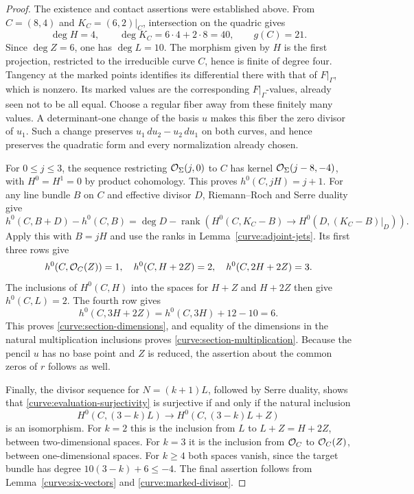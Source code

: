 \begin{proof}
The existence and contact assertions were established above.  From
$C=(8,4)$ and $K_C=(6,2)|_C$, intersection on the quadric gives
\[
 \deg H=4,\qquad \deg K_C=6\cdot4+2\cdot8=40,
 \qquad g(C)=21.
\]
Since $\deg Z=6$, one has $\deg L=10$.  The morphism given by $H$ is
the first projection, restricted to the irreducible curve $C$, hence
is finite of degree four.  Tangency at the marked points identifies
its differential there with that of $F|_\Gamma$, which is nonzero.
Its marked values are the corresponding $F|_\Gamma$-values, already
seen not to be all equal.  Choose a regular fiber away from these
finitely many values.  A determinant-one change of the basis $u$
makes this fiber the zero divisor of $u_1$.  Such a change preserves
$u_1\,du_2-u_2\,du_1$ on both curves, and hence preserves the
quadratic form and every normalization already chosen.

For $0\le j\le3$, the sequence restricting $\mathcal O_\Sigma(j,0)$ to
$C$ has kernel $\mathcal O_\Sigma(j-8,-4)$, with $H^0=H^1=0$ by product
cohomology.  This proves $h^0(C,jH)=j+1$.  For any line bundle $B$
on $C$ and effective divisor $D$, Riemann--Roch and Serre duality give
\begin{equation}\label{curve:dimension-formula}
 h^0(C,B+D)-h^0(C,B)
 =\deg D-\operatorname{rank}\left(
 H^0(C,K_C-B)\longrightarrow H^0(D,(K_C-B)|_D)\right).
\end{equation}
Apply this with $B=jH$ and use the ranks in
Lemma~\ref{curve:adjoint-jets}.  Its first three rows give
\[
 h^0(C,\mathcal O_C(Z))=1,
 \quad h^0(C,H+2Z)=2,
 \quad h^0(C,2H+2Z)=3.
\]
The inclusions of $H^0(C,H)$ into the spaces for $H+Z$ and $H+2Z$
then give $h^0(C,L)=2$.  The fourth row gives
\[
 h^0(C,3H+2Z)=h^0(C,3H)+12-10=6.
\]
This proves \eqref{curve:section-dimensions}, and equality of the
dimensions in the natural multiplication inclusions proves
\eqref{curve:section-multiplication}.  Because the pencil $u$ has no
base point and $Z$ is reduced, the assertion about the common zeros
of $r$ follows as well.

Finally, the divisor sequence for $N=(k+1)L$, followed by Serre
duality, shows that \eqref{curve:evaluation-surjectivity} is
surjective if and only if the natural inclusion
\[
 H^0(C,(3-k)L)\longrightarrow H^0(C,(3-k)L+Z)
\]
is an isomorphism.  For $k=2$ this is the inclusion from $L$ to
$L+Z=H+2Z$, between two-dimensional spaces.  For $k=3$ it is the
inclusion from $\mathcal O_C$ to $\mathcal O_C(Z)$, between one-dimensional
spaces.  For $k\ge4$ both spaces vanish, since the target bundle has
degree $10(3-k)+6\le-4$.  The final assertion follows from
Lemma~\ref{curve:six-vectors} and \eqref{curve:marked-divisor}.
\end{proof}


